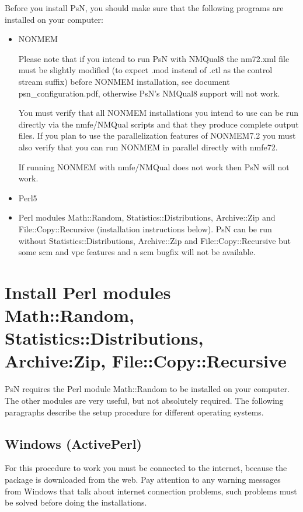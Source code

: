 



\maketitle

Before you install PsN, you should make sure that the following programs are installed on your computer:
\begin{itemize}
	\item NONMEM 

Please note that if you intend to run PsN with NMQual8 the nm72.xml file must be slightly modified (to expect .mod instead of .ctl as the control stream suffix) before NONMEM installation, see document psn\_configuration.pdf, otherwise PsN's NMQual8 support will not work.

You must verify that all NONMEM installations you intend to use can be run directly via the nmfe/NMQual scripts and that they produce complete output files. If you plan to use the parallelization features of NONMEM7.2 you must also verify that you can run NONMEM in parallel directly with nmfe72.

If running NONMEM with nmfe/NMQual does not work then PsN will not work. 
	\item Perl5
	\item Perl modules Math::Random, Statistics::Distributions, Archive::Zip and File::Copy::Recursive (installation instructions below). PsN can be run without Statistics::Distributions, Archive::Zip and File::Copy::Recursive but some scm and vpc features and a scm bugfix will not be available.
\end{itemize}

\section{Install Perl modules Math::Random, Statistics::Distributions, Archive:Zip, File::Copy::Recursive}
PsN requires the Perl module Math::Random to be installed on your computer. The other modules are very useful, but not absolutely required. The following paragraphs describe the setup procedure for different operating systems. 
\subsection{Windows (ActivePerl)}
For this procedure to work you must be connected to the internet, because the package is downloaded from the web. Pay attention to any warning messages from Windows that talk about internet connection problems, such problems must be solved before doing the installations.

